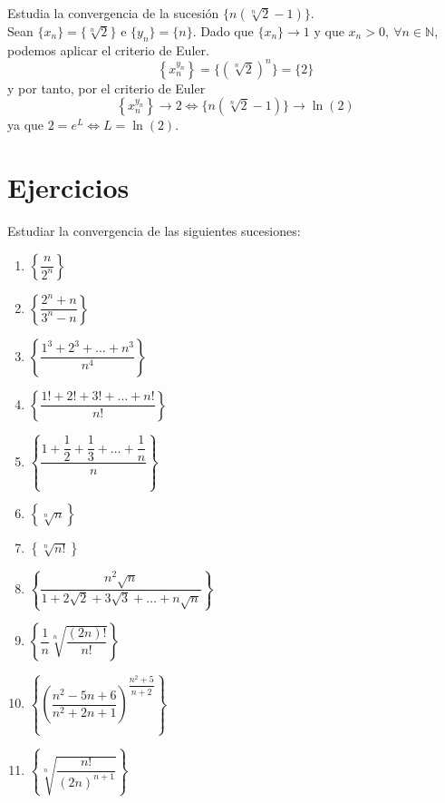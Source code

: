 \begin{ejemplo}
    Estudia la convergencia de la sucesión $\{n (\sqrt[n]{2}-1)\}$.\\
    
    Sean $\{x_n\} = \{\sqrt[n]{2}\}$ e $\{y_n\} = \{n\}$. Dado que $\{x_n\} \longrightarrow 1$ y que $x_n > 0, ~ \forall n \in \mathbb{N}$, podemos aplicar el criterio de Euler.
    \begin{equation*}
        \left\{ x_n^{y_n} \right\} = \{(\sqrt[n]{2})^n\} = \{2\}
    \end{equation*}
    y por tanto, por el criterio de Euler
    \begin{equation*}
       \left\{ x_n^{y_n} \right\} \longrightarrow 2 \Longleftrightarrow \{n (\sqrt[n]{2}-1)\} \longrightarrow \ln(2)
    \end{equation*}
    ya que $2 = e^L \Longleftrightarrow L = \ln(2)$.
\end{ejemplo}



\section{Ejercicios}

\begin{ejercicio}
    Estudiar la convergencia de las siguientes sucesiones:
    \begin{enumerate}
        \item $\left\{ \dfrac{n}{2^n} \right\}$
        \item $\left\{  \dfrac{2^n+n}{3^n-n} \right\}$
        \item $\left\{ \dfrac{1^3+2^3+\dots+n^3}{n^4}\right\}$
        \item $\left\{ \dfrac{1!+2!+3!+\dots+n!}{n!} \right\}$
        \item $\left\{ \dfrac{1+\dfrac{1}{2}+\dfrac{1}{3}+\dots+\dfrac{1}{n}}{n} \right\}$
        \item $\left\{ \sqrt[n]{n} \right\}$
        \item $\left\{ \sqrt[n]{n!} \right\}$
        \item $\left\{ \dfrac{n^2 \sqrt{n}}{1+2\sqrt{2}+3\sqrt{3}+\dots+n\sqrt{n}} \right\}$
        \item $\left\{ \dfrac{1}{n} \sqrt[n]{\dfrac{(2n)!}{n!}} \right\}$
        \item $\left\{ \left(\dfrac{n^2-5n+6}{n^2+2n+1}\right)^{\dfrac{n^2+5}{n+2}} \right\}$
        \item $\left\{ \sqrt[n]{\dfrac{n!}{(2n)^{n+1}}} \right\}$
    \end{enumerate}
\end{ejercicio}

